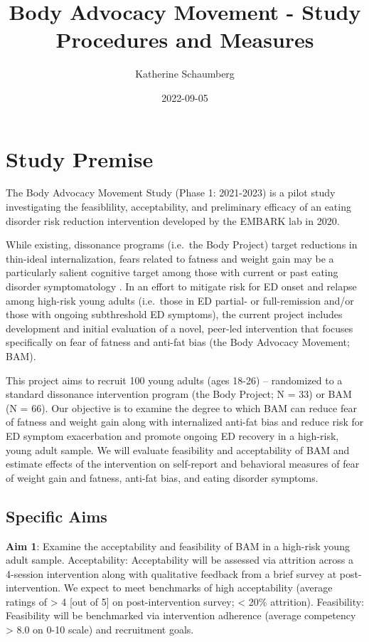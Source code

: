 \documentclass[
]{article}
\title{Body Advocacy Movement - Study Procedures and Measures}
\author{Katherine Schaumberg}
\date{2022-09-05}
\begin{document}
\maketitle

{
\setcounter{tocdepth}{2}
\tableofcontents
}
\hypertarget{study-premise}{%
\section{Study Premise}\label{study-premise}}

The Body Advocacy Movement Study (Phase 1: 2021-2023) is a pilot study investigating the feasiblility, acceptability, and preliminary efficacy of an eating disorder risk reduction intervention developed by the EMBARK lab in 2020.

While existing, dissonance programs (i.e.~the Body Project) target reductions in thin-ideal internalization, fears related to fatness and weight gain may be a particularly salient cognitive target among those with current or past eating disorder symptomatology \citep{levinsonAddressingFearFat2014}. In an effort to mitigate risk for ED onset and relapse among high-risk young adults (i.e.~those in ED partial- or full-remission and/or those with ongoing subthreshold ED symptoms), the current project includes development and initial evaluation of a novel, peer-led intervention that focuses specifically on fear of fatness and anti-fat bias (the Body Advocacy Movement; BAM).

This project aims to recruit 100 young adults (ages 18-26) -- randomized to a standard dissonance intervention program (the Body Project; N = 33) or BAM (N = 66). Our objective is to examine the degree to which BAM can reduce fear of fatness and weight gain along with internalized anti-fat bias and reduce risk for ED symptom exacerbation and promote ongoing ED recovery in a high-risk, young adult sample. We will evaluate feasibility and acceptability of BAM and estimate effects of the intervention on self-report and behavioral measures of fear of weight gain and fatness, anti-fat bias, and eating disorder symptoms.

\hypertarget{specific-aims}{%
\subsection{Specific Aims}\label{specific-aims}}

\textbf{Aim 1}: Examine the acceptability and feasibility of BAM in a high-risk young adult sample. Acceptability: Acceptability will be assessed via attrition across a 4-session intervention along with qualitative feedback from a brief survey at post-intervention. We expect to meet benchmarks of high acceptability (average ratings of \textgreater{} 4 {[}out of 5{]} on post-intervention survey; \textless{} 20\% attrition). Feasibility: Feasibility will be benchmarked via intervention adherence (average competency \textgreater{} 8.0 on 0-10 scale) and recruitment goals.
\end{document}
